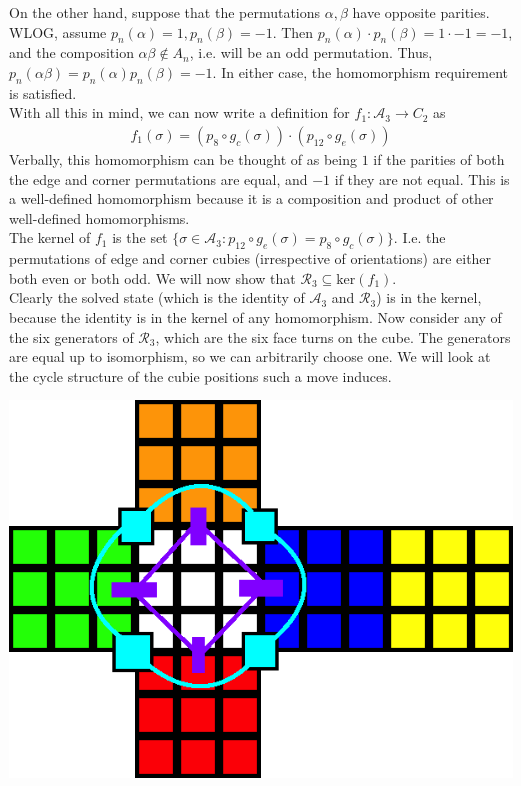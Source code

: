 \documentclass[10pt,letterpaper]{report}
\begin{document}
On the other hand, suppose that the permutations $\alpha, \beta$ have opposite parities.  WLOG, assume $p_n(\alpha) = 1, p_n(\beta) = -1$.  Then $p_n(\alpha) \cdot p_n(\beta) = 1 \cdot -1 = -1$, and the composition $\alpha \beta \notin A_n$, i.e. will be an odd permutation.  Thus, $p_n(\alpha \beta) = p_n(\alpha) p_n(\beta) = -1$.  In either case, the homomorphism requirement is satisfied. \\

With all this in mind, we can now write a definition for $f_1: \mathcal{A}_3 \rightarrow C_2$ as 
\begin{align*}
f_1(\sigma) = (p_8 \circ g_c(\sigma)) \cdot (p_{12} \circ g_e(\sigma))
\end{align*}
Verbally, this homomorphism can be thought of as being $1$ if the parities of both the edge and corner permutations are equal, and $-1$ if they are not equal.  This is a well-defined homomorphism because it is a composition and product of other well-defined homomorphisms. \\

The kernel of $f_1$ is the set $\{\sigma \in \mathcal{A}_3 : p_{12} \circ g_e(\sigma) = p_8 \circ g_c (\sigma) \}$.  I.e. the permutations of edge and corner cubies (irrespective of orientations) are either both even or both odd.  We will now show that $\mathcal{R}_3 \subseteq \text{ker}(f_1)$. \\

Clearly the solved state (which is the identity of $\mathcal{A}_3$ and $\mathcal{R}_3$) is in the kernel, because the identity is in the kernel of any homomorphism.  Now consider any of the six generators of $\mathcal{R}_3$, which are the six face turns on the cube.  The generators are equal up to isomorphism, so we can arbitrarily choose one.  We will look at the cycle structure of the cubie positions such a move induces.

\begin{center}
\includegraphics[scale=.5]{images/faceCubieCycle.png} 
\end{center}
\end{document}
